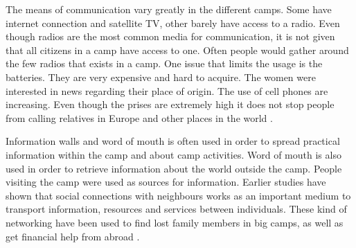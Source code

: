 The means of communication vary greatly in the different camps. Some have internet connection and satellite TV, other barely have access to a radio. Even though radios are the most common media for communication, it is not given that all citizens in a camp have access to one. Often people would gather around the few radios that exists in a camp. One issue that limits the usage is the batteries. They are very expensive and hard to acquire. The women were interested in news regarding their place of origin. The use of cell phones are increasing. Even though the prises are extremely high it does not stop people from calling relatives in Europe and other places in the world \cite{womenRefugee}.

Information walls and word of mouth is often used in order to spread practical information within the camp and about camp activities. Word of mouth is also used in order to retrieve information about the world outside the camp. People visiting the camp were used as sources for information. Earlier studies have shown that social connections with neighbours works as an important medium to transport information, resources and services between individuals. These kind of networking have been used to find lost family members in big camps, as well as get financial help from abroad \cite{womenRefugee}.  


